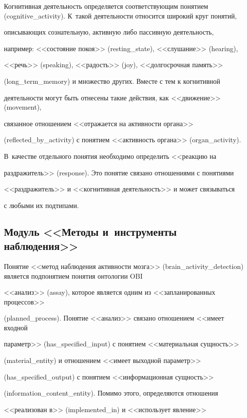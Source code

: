       

      Когнитивная деятельность определяется соответствующим понятием (cognitive\_activity). К~такой деятельности относится широкий круг понятий,

 описывающих сознательную, активную либо пассивную деятельность, 

например: <<состояние покоя>> (resting\_state), <<слушание>> (hearing), 

<<речь>> (speaking), <<радость>> (joy), <<долгосрочная память>> 

(long\_term\_memory) и множество других. Вместе с тем к когнитивной 

деятельности могут быть отнесены такие действия, как <<движение>> (movement),

 связанное отношением <<отражается на активности органа>> 

 (reflected\_by\_activity) с понятием <<активность органа>> (organ\_activity). 

В~качестве отдельного понятия необходимо определить <<реакцию на

 раздражитель>> (response). Это понятие связано отношениями с понятиями 

 <<раздражитель>> и <<когнитивная деятельность>> и может связываться 

с любыми их подтипами.



\subsection{Модуль <<Методы и~инструменты наблюдения>>}



      Понятие <<метод наблюдения активности мозга>> (brain\_activity\_detection) является подпонятием понятия онтологии OBI 

<<анализ>> (assay), которое является одним из <<запланированных процессов>> 

(planned\_process). Понятие <<анализ>> связано отношением <<имеет входной 

параметр>> (has\_specified\_input) с понятием <<материальная сущность>> 

(material\_entity) и отношением <<имеет выходной параметр>> 

(has\_specified\_output) с понятием <<информационная сущность>> 

(information\_content\_entity). Помимо этого, определяются отношения 

<<реализован в>> (implemented\_in) и <<использует явление>> 

